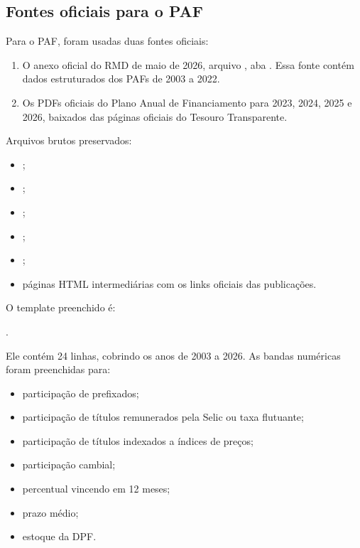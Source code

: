 \documentclass[12pt,a4paper]{article}
\begin{document}
\subsection{Fontes oficiais para o PAF}

Para o PAF, foram usadas duas fontes oficiais:

\begin{enumerate}[leftmargin=1.2cm]
    \item O anexo oficial do RMD de maio de 2026, arquivo
    , aba . Essa fonte contém dados estruturados dos PAFs
    de 2003 a 2022.
    \item Os PDFs oficiais do Plano Anual de Financiamento para 2023, 2024, 2025 e
    2026, baixados das páginas oficiais do Tesouro Transparente.
\end{enumerate}

Arquivos brutos preservados:

\begin{itemize}[leftmargin=1.2cm]
    \item {};
    \item {};
    \item {};
    \item {};
    \item {};
    \item páginas HTML intermediárias com os links oficiais das publicações.
\end{itemize}

O template preenchido é:
\begin{center}
.
\end{center}

Ele contém 24 linhas, cobrindo os anos de 2003 a 2026. As bandas numéricas foram
preenchidas para:

\begin{itemize}[leftmargin=1.2cm]
    \item participação de prefixados;
    \item participação de títulos remunerados pela Selic ou taxa flutuante;
    \item participação de títulos indexados a índices de preços;
    \item participação cambial;
    \item percentual vincendo em 12 meses;
    \item prazo médio;
    \item estoque da DPF.
\end{itemize}
\end{document}
